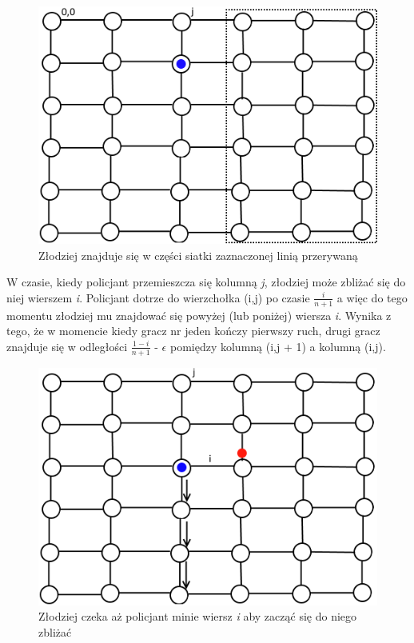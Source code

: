 \documentclass[brudnopis]{xmgr}
\begin{document}
\begin{figure}[ht!]
  \centering
  \includegraphics{rysunki/podsiatka.png}
  \caption{Złodziej znajduje się w części siatki zaznaczonej linią przerywaną}
\end{figure} 
\indent W czasie, kiedy policjant przemieszcza się kolumną \textit{j}, złodziej może zbliżać się do niej wierszem \textit{i}. Policjant dotrze do wierzchołka (i,j) po czasie $\frac{i}{n+1}$ a więc do tego momentu złodziej mu znajdować się powyżej (lub poniżej) wiersza \textit{i}. Wynika z tego, że w momencie kiedy gracz nr jeden kończy pierwszy ruch, drugi gracz znajduje się w odległości $\frac{1-i}{n+1}$ - $\epsilon$ pomiędzy kolumną (i,j + 1) a kolumną (i,j).
\begin{figure}[ht!]
  \centering
  \includegraphics{rysunki/poscig_3.png}
  \caption{Złodziej czeka aż policjant minie wiersz \textit{i} aby zacząć się do niego zbliżać}
\end{figure} 
\end{document}
